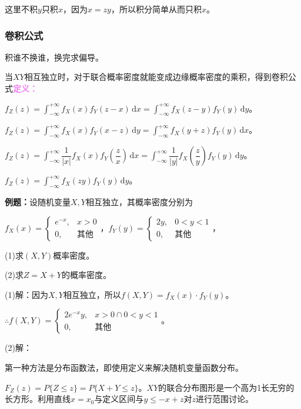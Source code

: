 \documentclass[UTF8, 12pt]{ctexart}
\begin{document}
这里不积$y$只积$x$，因为$x=zy$，所以积分简单从而只积$x$。

\subsubsection{卷积公式}

积谁不换谁，换完求偏导。

当$XY$相互独立时，对于联合概率密度就能变成边缘概率密度的乘积，得到卷积公式\textcolor{violet}{\textbf{定义：}}

$f_Z(z)=\int_{-\infty}^{+\infty}f_X(x)f_Y(z-x)\,\textrm{d}x=\int_{-\infty}^{+\infty}f_X(z-y)f_Y(y)\,\textrm{d}y$。

$f_Z(z)=\int_{-\infty}^{+\infty}f_X(x)f_Y(x-z)\,\textrm{d}y=\int_{-\infty}^{+\infty}f_X(y+z)f_Y(y)\,\textrm{d}x$。

$f_Z(z)=\displaystyle{\int_{-\infty}^{+\infty}}\dfrac{1}{\vert x\vert}f_X(x)f_Y\left(\dfrac{z}{x}\right)\,\textrm{d}x=\displaystyle{\int_{-\infty}^{+\infty}}\dfrac{1}{\vert y\vert}f_X\left(\dfrac{z}{y}\right)f_Y(y)\,\textrm{d}y$。

$f_Z(z)=\int_{-\infty}^{+\infty}f_X(zy)f_Y(y)\,\textrm{d}y$。

\textbf{例题：}设随机变量$X,Y$相互独立，其概率密度分别为

$f_X(x)=\left\{\begin{array}{ll}
    e^{-x}, & x>0 \\
    0, & \text{其他} 
\end{array}\right.$，$f_Y(y)=\left\{\begin{array}{ll}
    2y, & 0<y<1 \\
    0, & \text{其他} 
\end{array}\right.$，

(1)求$(X,Y)$概率密度。

(2)求$Z=X+Y$的概率密度。

(1)解：因为$X,Y$相互独立，所以$f(X,Y)=f_X(x)\cdot f_Y(y)$。

$\therefore f(X,Y)=\left\{\begin{array}{ll}
    2e^{-x}y, & x>0\cap0<y<1 \\
    0, & \text{其他} 
\end{array}\right.$。

(2)解：

第一种方法是分布函数法，即使用定义来解决随机变量函数分布。

$F_Z(z)=P\{Z\leqslant z\}=P\{X+Y\leqslant z\}$。$XY$的联合分布图形是一个高为1长无穷的长方形。利用直线$x=x_0$与定义区间与$y\leqslant -x+z$对$z$进行范围讨论。
\end{document}
